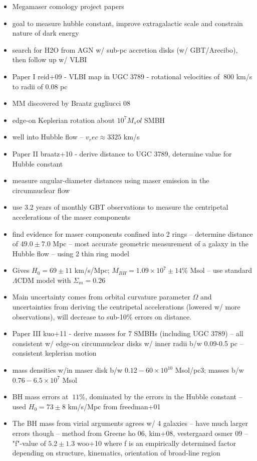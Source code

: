 \begin{itemize}
\item Megamaser comology project papers
\item goal to measure hubble constant, improve extragalactic scale and constrain nature of dark energy
\item search for H2O from AGN w/ sub-pc accretion disks (w/ GBT/Arecibo), then follow up w/ VLBI
\item Paper I  reid+09 - VLBI map in UGC 3789 - rotational velocities of $~800$ km/s to radii of 0.08 pc
\item MM discovered by Braatz gugliucci 08
\item edge-on Keplerian rotation about $10^7 M_sol$ SMBH
\item well into Hubble flow -- $v_rec\approx3325$ km/s
\item Paper II braatz+10 - derive distance to UGC 3789, determine value for Hubble constant
\item measure angular-diameter distances using maser emission in the circumnuclear flow
\item use 3.2 years of monthly GBT observations to measure the centripetal accelerations of the maser components
\item find evidence for maser components confined into 2 rings -- determine distance of $49.0\pm7.0$ Mpc -- most accurate geometric measurement of a galaxy in the Hubble flow -- using 2 thin ring model
\item Gives $H_0=69\pm11$ km/s/Mpc; $M_{BH}=1.09\times10^7 \pm 14\% $ Msol -- use standard $\Lambda$CDM model with $\Sigma_m=0.26$
\item Main uncertainty comes from orbital curvature parameter $\Omega$ and uncertainties from deriving the centripetal accelerations (lowered w/ more observations), will decrease to sub-10\% errors on distance.
\item Paper III kuo+11 - derive masses for 7 SMBHs (including UGC 3789) -- all consistent w/ edge-on circumnuclear disks w/ inner radii b/w 0.09-0.5 pc -- consistent keplerian motion
\item mass densities w/in maser disk b/w $0.12-60\times10^{10}$ Msol/pc3; masses b/w $0.76-6.5\times10^7$ Msol
\item BH mass errors at $~11$\%, dominated by the errors in the Hubble constant -- used $H_0=73\pm8$ km/s/Mpc from freedman+01
\item The BH mass from virial arguments agrees w/ 4 galaxies -- have much larger errors though -- method from Greene ho 06, kim+08, vestergaard osmer 09 -- "f"-value of $5.2\pm1.3$  woo+10 where f is an empirically determined factor depending on structure, kinematics, orientation of broad-line region

\end{itemize}
